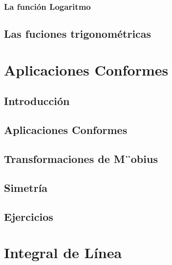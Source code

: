 \documentclass[]{book}
\theoremstyle{definition}
\theoremstyle{definition}
\theoremstyle{definition}
\theoremstyle{remark}
\begin{document}
\hypertarget{la-funciuxf3n-logaritmo}{%
\subsection{La función Logaritmo}\label{la-funciuxf3n-logaritmo}}

\hypertarget{las-fuciones-trigonomuxe9tricas}{%
\section{Las fuciones trigonométricas}\label{las-fuciones-trigonomuxe9tricas}}

\hypertarget{aplicaciones-conformes}{%
\chapter{Aplicaciones Conformes}\label{aplicaciones-conformes}}

\hypertarget{introducciuxf3n}{%
\section{Introducción}\label{introducciuxf3n}}

\hypertarget{aplicaciones-conformes-1}{%
\section{Aplicaciones Conformes}\label{aplicaciones-conformes-1}}

\hypertarget{transformaciones-de-mobius}{%
\section{Transformaciones de M¨obius}\label{transformaciones-de-mobius}}

\hypertarget{simetruxeda}{%
\section{Simetría}\label{simetruxeda}}

\hypertarget{ejercicios-2}{%
\section{Ejercicios}\label{ejercicios-2}}

\hypertarget{integral-de-luxednea}{%
\chapter{Integral de Línea}\label{integral-de-luxednea}}
\end{document}
